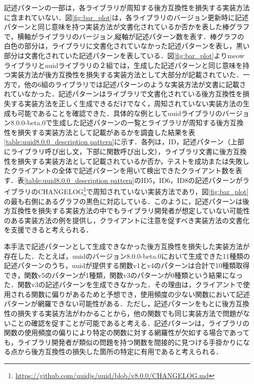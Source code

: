 \documentclass[11pt]{jreport}
\begin{document}
記述パターンの一部は，各ライブラリが周知する後方互換性を損失する実装方法に含まれていない．図\ref{fig:bar_plot}は，各ライブラリのバージョン更新時に記述パターンと同じ意味を持つ実装方法が文書化されているか否かを表した棒グラフで，横軸がライブラリのバージョン,縦軸が記述パターン数を表す．棒グラフの白色の部分は，ライブラリに文書化されていなかった記述パターンを表し，黒い部分は文書化されていた記述パターンを表している．図\ref{fig:bar_plot}よりmeowライブラリとuuidライブラリの２組では，生成した記述パターンと同じ意味を持つ実装方法が後方互換性を損失する実装方法として大部分が記載されていた．一方で，他の6組のライブラリでは記述パターンのような実装方法が文書に記載されていなかった．記述パターンはライブラリで文書化されている後方互換性を損失する実装方法を正しく生成できるだけでなく，周知されていない実装方法の生成も可能であることを確認できた．具体的な例としてuuidライブラリのバージョン8.0.0-beta.0で生成した記述パターンの一覧とライブラリが周知する後方互換性を損失する実装方法として記載があるかを調査した結果を表\ref{table:uuid8.0.0_description pattern}に示す．各列は，ID，記述パターン（上部にライブラリ呼び出し文，下部に関数呼び出し文），ライブラリ文書に後方互換性を損失する実装方法として記載されているか否か，テストを成功または失敗したクライアントの全体で記述パターンを用いて検出できたクライアント数を表す．表\ref{table:uuid8.0.0_description pattern}のID5，ID6，ID8の記述パターンがライブラリのCHANGELOG\footnote{\url{https://github.com/uuidjs/uuid/blob/v8.0.0/CHANGELOG.md}}で周知されていない実装方法であり，図\ref{fig:bar_plot}の最も右側にあるグラフの黒色に対応している．このように，記述パターンは後方互換性を損失する実装方法の中でもライブラリ開発者が想定していない可能性のある実装方法の例を提供し，クライアントに注意を促すべき実装方法の文書化を支援できると考えられる．

本手法で記述パターンとして生成できなかった後方互換性を損失した実装方法が存在した．たとえば，uuidのバージョン8.0.0-beta.0において生成できた11種類の記述パターンのうち，uuidが提供する関数v1とv4のパターンは合計で10種類取得でき，関数v5のパターンが1種類，関数v3のパターンが0種類という結果になった．関数v3の記述パターンを生成できなかった．その理由は，クライアントで使用される関数に偏りがあるためと予想でき，使用頻度の少ない関数において記述パターンが網羅できない可能性がある．ただし，記述パターンをもとに後方互換性の損失する実装方法がわかることから，他の関数でも同じ実装方法で問題がないことの確認を促すことが可能であると考える．記述パターンは，ライブラリの関数の使用頻度の偏りにより特定の関数に対する網羅性が欠如する場合であっても，ライブラリ開発者が類似の問題を持つ関数を間接的に見つける手掛かりになる点から後方互換性の損失した箇所の特定に有用であると考えられる．
\end{document}
